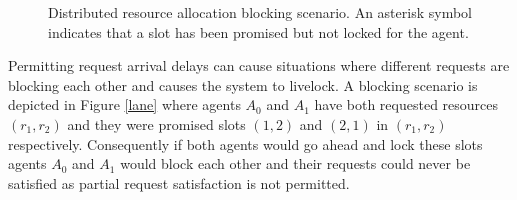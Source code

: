 \begin{figure}
\begin{center}
	\end{center}
		\caption{Distributed resource allocation blocking scenario. An asterisk symbol indicates that a slot has been promised but not locked for the agent.}
	\label{lane1}
\end{figure}

Permitting request arrival delays can cause situations where different requests are blocking each other and causes the system to livelock. A blocking scenario is depicted in Figure \ref{lane} where agents ${A_0}$ and ${A_1}$ have both requested resources ${(r_1, r_2)}$ and they were promised slots ${(1, 2)}$ and ${(2, 1)}$ in ${(r_1, r_2)}$ respectively. Consequently if both agents would go ahead and lock these slots agents ${A_0}$ and ${A_1}$ would block each other and their requests could never be satisfied as partial request satisfaction is not permitted. 

